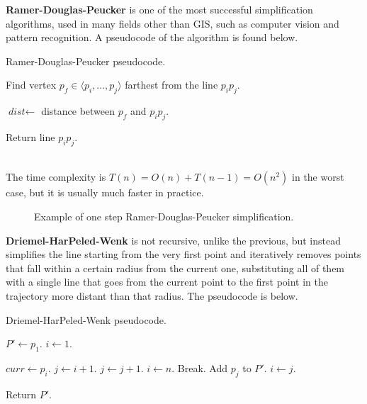 \textbf{Ramer-Douglas-Peucker} is one of the most successful simplification algorithms, used in many fields other than GIS, such as computer vision and pattern recognition. A pseudocode of the algorithm is found below.
\begin{algorithm}
\caption{Ramer-Douglas-Peucker pseudocode.} 
\begin{algorithmic}[1]
    \State{}
    
    \State Find vertex $p_f \in \langle p_i, \dots, p_j \rangle$ farthest from the line $p_i p_j$.
        
    \State $\textit{dist} \gets$ distance between $p_f$ and $p_i p_j$.

        \State {}
        \State {}
    \EndIf

    \State Return line $p_i p_j$.
    \EndFunction
\end{algorithmic}
\end{algorithm} \\
The time complexity is $T(n) = O(n) + T(n-1) = O(n^2)$ in the worst case, but it is usually much faster in practice.
\begin{figure}[!ht]
    \centering
    
    \caption{Example of one step Ramer-Douglas-Peucker simplification.}
    \label{fig:ramer-douglas-peucker}
\end{figure}


\textbf{Driemel-HarPeled-Wenk} is not recursive, unlike the previous, but instead simplifies the line starting from the very first point and iteratively removes points that fall within a certain radius from the current one, substituting all of them with a single line that goes from the current point to the first point in the trajectory more distant than that radius. The pseudocode is below.
\begin{algorithm}
\caption{Driemel-HarPeled-Wenk pseudocode.}
\begin{algorithmic}[1]
     
    
    \State $P' \gets p_1$.
    \State $i \gets 1$.
    
        \State $\textit{curr} \gets p_i$.
        \State $j \gets i+1$.
            \State $j \gets j+1$.
                \State $i \gets n$.
                \State Break. 
            \EndIf
        \EndWhile
        \State Add $p_j$ to $P'$.
        \State $i \gets j$.
    \EndWhile

    \State Return $P'$.
    \EndFunction
\end{algorithmic}
\end{algorithm}

